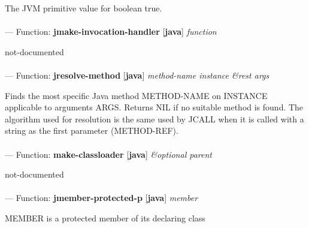 \begin{adjustwidth}{5em}{5em}
The JVM primitive value for boolean true.
\end{adjustwidth}

\paragraph{}
\label{JAVA:JMAKE-INVOCATION-HANDLER}
--- Function: \textbf{jmake-invocation-handler} [\textbf{java}] \textit{function}

\begin{adjustwidth}{5em}{5em}
not-documented
\end{adjustwidth}

\paragraph{}
\label{JAVA:JRESOLVE-METHOD}
--- Function: \textbf{jresolve-method} [\textbf{java}] \textit{method-name instance \&rest args}

\begin{adjustwidth}{5em}{5em}
Finds the most specific Java method METHOD-NAME on INSTANCE applicable to arguments ARGS. Returns NIL if no suitable method is found. The algorithm used for resolution is the same used by JCALL when it is called with a string as the first parameter (METHOD-REF).
\end{adjustwidth}

\paragraph{}
\label{JAVA:MAKE-CLASSLOADER}
--- Function: \textbf{make-classloader} [\textbf{java}] \textit{\&optional parent}

\begin{adjustwidth}{5em}{5em}
not-documented
\end{adjustwidth}

\paragraph{}
\label{JAVA:JMEMBER-PROTECTED-P}
--- Function: \textbf{jmember-protected-p} [\textbf{java}] \textit{member}

\begin{adjustwidth}{5em}{5em}
MEMBER is a protected member of its declaring class
\end{adjustwidth}

